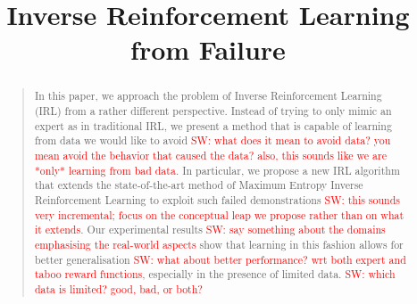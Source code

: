 \documentclass[letterpaper]{article}
\newcommand{\sw}[1]{\textcolor{red}{SW: #1}}
\begin{document}
%
\title{Inverse Reinforcement Learning from Failure}
\maketitle
\begin{abstract}
\begin{quote}
In this paper, we approach the problem of Inverse Reinforcement Learning (IRL) from a rather different perspective. Instead of trying to only mimic an expert as in traditional IRL, we present a method that is capable of learning from data we would like to avoid \sw{what does it mean to avoid data? you mean avoid the behavior that caused the data? also, this sounds like we are *only* learning from bad data}. In particular, we propose a new IRL algorithm that extends the state-of-the-art method of Maximum Entropy Inverse Reinforcement Learning to exploit such failed demonstrations \sw{this sounds very incremental; focus on the conceptual leap we propose rather than on what it extends}. Our experimental results \sw{say something about the domains emphasising the real-world aspects} show that learning in this fashion allows for better generalisation \sw{what about better performance? wrt both expert and taboo reward functions}, especially in the presence of limited data. \sw{which data is limited? good, bad, or both?}
\end{quote}
\end{abstract}
\end{document}
